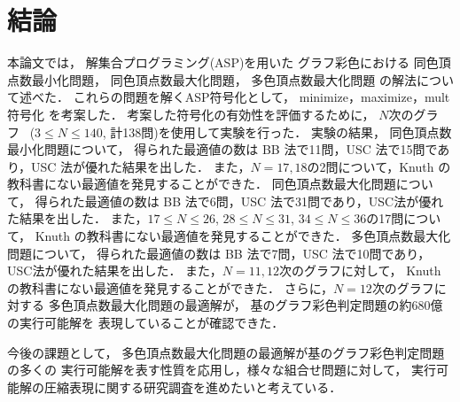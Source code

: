 \chapter{結論}\label{chap]conclusion}
本論文では，
解集合プログラミング(ASP)を用いた
グラフ彩色における
同色頂点数最小化問題，
同色頂点数最大化問題，
多色頂点数最大化問題
の解法について述べた．
これらの問題を解くASP符号化として，
\textsf{minimize}，\textsf{maximize}，\textsf{mult}符号化
を考案した．
考案した符号化の有効性を評価するために，
$N$次のグラフ~\cite{Knuth:TAOCP:SAT}
($3\leq N\leq 140$, 計138問)を使用して実験を行った．
%
実験の結果，
同色頂点数最小化問題について，
得られた最適値の数は BB 法で11問，USC 法で15問であり，USC 法が優れた結果を出した．
また，$N=17,18$の2問について，Knuth の教科書にない最適値を発見することができた．
%
同色頂点数最大化問題について，
得られた最適値の数は BB 法で6問，USC 法で31問であり，USC法が優れた結果を出した．
また，$17\leq N\leq 26$, $28\leq N\leq 31$, $34\leq N\leq 36$の17問について，
Knuth の教科書にない最適値を発見することができた．
%
多色頂点数最大化問題について，
得られた最適値の数は BB 法で7問，USC 法で10問であり，USC法が優れた結果を出した．
また，$N=11,12$次のグラフに対して，
Knuth の教科書にない最適値を発見することができた．
さらに，$N=12$次のグラフに対する
多色頂点数最大化問題の最適解が，
基のグラフ彩色判定問題の約680億の実行可能解を
表現していることが確認できた．
%

今後の課題として，
多色頂点数最大化問題の最適解が基のグラフ彩色判定問題の多くの
実行可能解を表す性質を応用し，様々な組合せ問題に対して，
実行可能解の圧縮表現に関する研究調査を進めたいと考えている．

